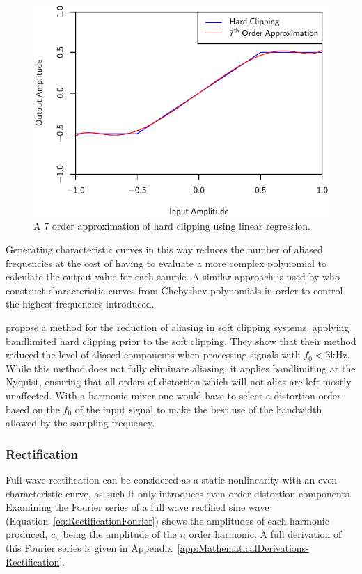 			\begin{figure}[h!]
				\centering
				\includegraphics{chapter5/Images/ClippingApproximation.pdf}
				\caption{A 7 order approximation of hard clipping using linear regression.}
				\label{fig:ClippingApproximation}
			\end{figure}

			Generating characteristic curves in this way reduces the number of aliased frequencies at the cost
			of having to evaluate a more complex polynomial to calculate the output value for each sample. A
			similar approach is used by \citet{fernandez-cid2001distortion} who construct characteristic curves
			from Chebyshev polynomials in order to control the highest frequencies introduced.

			\citet{esqueda2015aliasing} propose a method for the reduction of aliasing in soft clipping
			systems, applying bandlimited hard clipping prior to the soft clipping. They show that their method
			reduced the level of aliased components when processing signals with $f_{0} < 3$kHz. While this
			method does not fully eliminate aliasing, it applies bandlimiting at the Nyquist, ensuring that all
			orders of distortion which will not alias are left mostly unaffected. With a harmonic mixer one
			would have to select a distortion order based on the $f_{0}$ of the input signal to make the best
			use of the bandwidth allowed by the sampling frequency.

		\subsubsection*{Rectification}
			Full wave rectification can be considered as a static nonlinearity with an even characteristic
			curve, as such it only introduces even order distortion components. Examining the Fourier series of
			a full wave rectified sine wave (Equation~\ref{eq:RectificationFourier}) shows the amplitudes of
			each harmonic produced, $c_{n}$ being the amplitude of the $n$ order harmonic. A full
			derivation of this Fourier series is given in
			Appendix~\ref{app:MathematicalDerivations-Rectification}.

